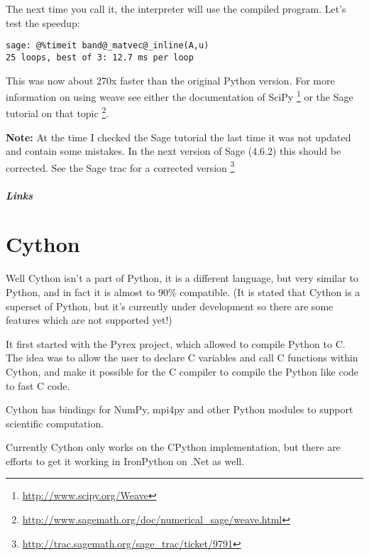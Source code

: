 \documentclass[letterpaper,10pt,english]{manual}
\begin{document}
The next time you call it, the interpreter will use the compiled
program.
Let's test the speedup:

\begin{Verbatim}[commandchars=@\[\]]
sage: @%timeit band@_matvec@_inline(A,u)
25 loops, best of 3: 12.7 ms per loop
\end{Verbatim}

This was now about 270x faster than the original Python version.
For more information on using weave see either the documentation of
SciPy \footnote{
\href{http://www.scipy.org/Weave}{http://www.scipy.org/Weave}
} or the Sage tutorial on that topic \footnote{
\href{http://www.sagemath.org/doc/numerical\_sage/weave.html}{http://www.sagemath.org/doc/numerical\_sage/weave.html}
}.

\textbf{Note:} At the time I checked the Sage tutorial the last time
it was not updated and contain some mistakes. In the next version of
Sage (4.6.2) this should be corrected. See the Sage trac for a corrected
version \footnote{
\href{http://trac.sagemath.org/sage\_trac/ticket/9791}{http://trac.sagemath.org/sage\_trac/ticket/9791}
}
\paragraph{Links}

\resetcurrentobjects
\hypertarget{--doc-Cython}{}

\chapter{Cython}

Well Cython isn't a part of Python, it is a different language, but
very similar to Python, and in fact it is almost to 90\% compatible.
(It is stated that Cython is a superset of Python, but it's currently
under development so there are some features which are not supported yet!)

It first started with the Pyrex project, which allowed to compile
Python to C. The idea was to allow the user to declare C variables and
call C functions within Cython, and make it possible for the C
compiler
to compile the Python like code to fast C code.

Cython has bindings for NumPy, mpi4py and other Python modules to
support scientific computation.

Currently Cython only works on the CPython implementation, but there
are efforts to get it working in IronPython on .Net as well.
\end{document}
